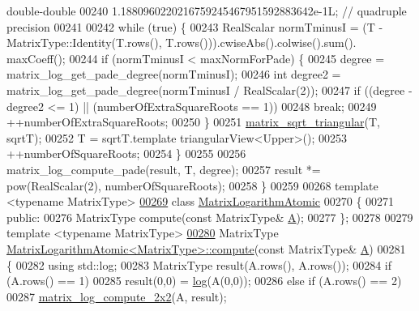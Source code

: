 \begin{DoxyCode}
{       double-double}
00240                                                        1.1880960220216759245467951592883642e-1L;  \textcolor{comment}{//
       quadruple precision}
00241 
00242   \textcolor{keywordflow}{while} (\textcolor{keyword}{true}) \{
00243     RealScalar normTminusI = (T - MatrixType::Identity(T.rows(), T.rows())).cwiseAbs().colwise().sum().
      maxCoeff();
00244     \textcolor{keywordflow}{if} (normTminusI < maxNormForPade) \{
00245       degree = matrix\_log\_get\_pade\_degree(normTminusI);
00246       \textcolor{keywordtype}{int} degree2 = matrix\_log\_get\_pade\_degree(normTminusI / RealScalar(2));
00247       \textcolor{keywordflow}{if} ((degree - degree2 <= 1) || (numberOfExtraSquareRoots == 1)) 
00248         \textcolor{keywordflow}{break};
00249       ++numberOfExtraSquareRoots;
00250     \}
00251     \hyperlink{namespace_eigen_ae51c91f920f6ea4a7f6f72caa1e8249f}{matrix\_sqrt\_triangular}(T, sqrtT);
00252     T = sqrtT.template triangularView<Upper>();
00253     ++numberOfSquareRoots;
00254   \}
00255 
00256   matrix\_log\_compute\_pade(result, T, degree);
00257   result *= pow(RealScalar(2), numberOfSquareRoots);
00258 \}
00259 
00268 \textcolor{keyword}{template} <\textcolor{keyword}{typename} MatrixType>
\hyperlink{class_eigen_1_1internal_1_1_matrix_logarithm_atomic}{00269} \textcolor{keyword}{class }\hyperlink{class_eigen_1_1internal_1_1_matrix_logarithm_atomic}{MatrixLogarithmAtomic}
00270 \{
00271 \textcolor{keyword}{public}:
00276   MatrixType compute(\textcolor{keyword}{const} MatrixType& \hyperlink{group___core___module_class_eigen_1_1_matrix}{A});
00277 \};
00278 
00279 \textcolor{keyword}{template} <\textcolor{keyword}{typename} MatrixType>
\hyperlink{class_eigen_1_1internal_1_1_matrix_logarithm_atomic_a14d76ac8fb2bc662a9560a76f7df4fe7}{00280} MatrixType \hyperlink{class_eigen_1_1internal_1_1_matrix_logarithm_atomic_a14d76ac8fb2bc662a9560a76f7df4fe7}{MatrixLogarithmAtomic<MatrixType>::compute}(\textcolor{keyword}{const} 
      MatrixType& \hyperlink{group___core___module_class_eigen_1_1_matrix}{A})
00281 \{
00282   \textcolor{keyword}{using} std::log;
00283   MatrixType result(A.rows(), A.rows());
00284   \textcolor{keywordflow}{if} (A.rows() == 1)
00285     result(0,0) = \hyperlink{structlog}{log}(A(0,0));
00286   \textcolor{keywordflow}{else} \textcolor{keywordflow}{if} (A.rows() == 2)
00287     \hyperlink{namespace_eigen_1_1internal_a1cb8d312c017f94570a52317fd1ece5f}{matrix\_log\_compute\_2x2}(A, result);

\end{DoxyCode}
